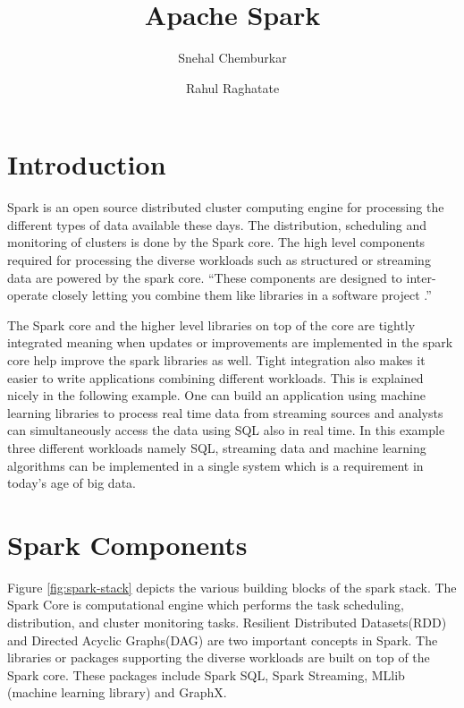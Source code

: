 \documentclass[9pt,twocolumn,twoside]{styles/osajnl}
\title{Apache Spark}
\author[1]{Snehal Chemburkar}
\author[1]{Rahul Raghatate}
\affil[1]{School of Informatics and Computing, Bloomington, IN 47408, U.S.A.}
\affil[*]{Corresponding authors: snehchem@iu.edu, rraghtate@iu.edu}
\begin{document}
\maketitle

\section{Introduction}

Spark is an open source distributed cluster computing engine for
processing the different types of data available these days. The
distribution, scheduling and monitoring of clusters is done by the
Spark core. The high level components required for processing the diverse workloads such as structured or streaming data are powered by the spark core. “These components are designed to inter-operate closely letting
you combine them like libraries in a software project \cite{book-spark}.”

The Spark core and the higher level libraries on top of the core are
tightly integrated meaning when updates or improvements are
implemented in the spark core help improve the spark libraries as
well. Tight integration also makes it easier to write applications
combining different workloads. This is explained nicely in the
following example. One can build an application using machine learning
libraries to process real time data from streaming sources and
analysts can simultaneously access the data using SQL also in real
time.  In this example three different workloads namely SQL, streaming
data and machine learning algorithms can be implemented in a single
system which is a requirement in today’s age of big data.

\section{Spark Components}

Figure \ref{fig:spark-stack} depicts the various building blocks of
the spark stack. The Spark Core is computational engine which performs the task scheduling, distribution, and cluster monitoring tasks. Resilient Distributed Datasets(RDD) \cite{paper-RDD} and Directed Acyclic Graphs(DAG) are two important concepts in Spark. The libraries or packages supporting the diverse workloads are built on top of the Spark core. These packages include Spark SQL, Spark Streaming, MLlib (machine learning library) and GraphX.
\end{document}

